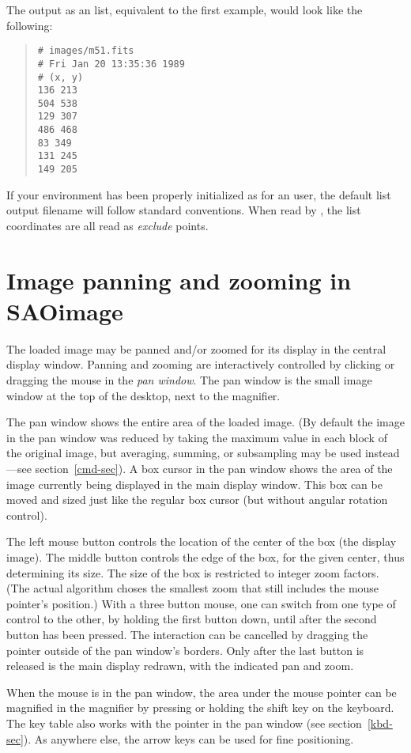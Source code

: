 The output as an  list, equivalent to the first example, would
look like the following:
\begin{quote}
\begin{verbatim}
# images/m51.fits
# Fri Jan 20 13:35:36 1989
# (x, y)
136 213
504 538
129 307
486 468
83 349
131 245
149 205
\end{verbatim}
\end{quote}
If your environment has been properly initialized as for an {\IRAF}
 user, the default list output filename will follow standard
{\IRAF} conventions.  When read by {\SAO}, the list coordinates are all read as
{\em exclude} points.

\section{ Image panning and zooming in SAOimage } \label{pan-sec}

The loaded image may be panned and/or zoomed for its display in the
central display window.  Panning and zooming are interactively
controlled by clicking or dragging the mouse in the {\em pan window}.
The pan window is the small image window at the top of the desktop, next to
the magnifier.

The pan window shows the entire area of the loaded image.  (By
default the image in the pan window was reduced by taking the
maximum value in each block of the original image, but averaging,
summing, or subsampling may be used instead---see section~\ref{cmd-sec}).
A box cursor in the pan window shows the area of the
image currently being displayed in the main display window.  This
box can be moved and sized just like the regular box cursor (but
without angular rotation control).

The left mouse button controls the location of the center of the
box (the display image).  The middle button controls the edge of
the box, for the given center, thus determining its size.  The
size of the box is restricted to integer zoom factors.  (The
actual algorithm choses the smallest zoom that still includes the
mouse pointer's position.)  With a three button mouse, one can switch
from one type of control to the other, by holding the first button
down, until after the second button has been pressed.  The interaction
can be cancelled by dragging the pointer outside of the pan
window's borders.  Only after the last button is released is
the main display redrawn, with the indicated pan and zoom.

When the mouse is in the pan window, the area under the mouse
pointer can be magnified in the magnifier by pressing or holding
the shift key on the keyboard.  The  key table also works
with the pointer in the pan window (see section~\ref{kbd-sec}).
As anywhere else, the arrow keys can be used for fine
positioning.

